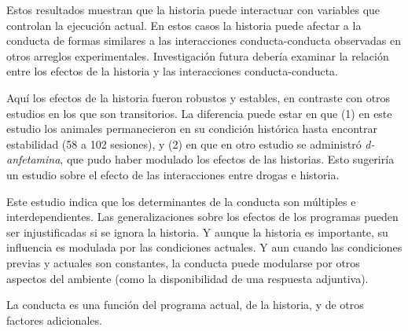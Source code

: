 \documentclass[a4paper,12pt]{article}
\begin{document}
Estos resultados muestran que la historia puede interactuar con variables que controlan la ejecución actual. En estos casos la historia puede afectar a la conducta de formas similares a las interacciones conducta-conducta observadas en otros arreglos experimentales. Investigación futura debería examinar la relación entre los efectos de la historia y las interacciones conducta-conducta.

Aquí los efectos de la historia fueron robustos y estables, en contraste con otros estudios en los que son transitorios. La diferencia puede estar en que (1) en este estudio los animales permanecieron en su condición histórica hasta encontrar estabilidad (58 a 102 sesiones), y (2) en que en otro estudio se administró {\itshape d-anfetamina}, que pudo haber modulado los efectos de las historias. Esto sugeriría un estudio sobre el efecto de las interacciones entre drogas e historia.

Este estudio indica que los determinantes de la conducta son múltiples e interdependientes. Las generalizaciones sobre los efectos de los programas pueden ser injustificadas si se ignora la historia. Y aunque la historia es importante, su influencia es modulada por las condiciones actuales. Y aun cuando las condiciones previas y actuales son constantes, la conducta puede modularse por otros aspectos del ambiente (como la disponibilidad de una respuesta adjuntiva).

La conducta es una función del programa actual, de la historia, y de otros factores adicionales.
\end{document}
